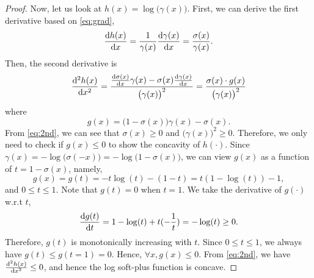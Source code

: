 \documentclass{article}
\begin{document}
\begin{proof}
Now, let us look at $h(x) = \log\big(\gamma(x)\big)$. First, we can derive the first derivative based on \eqref{eq:grad}, 
\[
\frac{{\rm d} h(x)}{{\rm d} x} = \frac{1}{\gamma(x)} \frac{{\rm d} \gamma(x)}{{\rm d} x} = \frac{\sigma(x)}{\gamma(x)}.
\]
Then, the second derivative is 
\begin{align}
\frac{{\rm d}^2 h(x)}{{\rm d} x^2} = \frac{\frac{{\rm d} \sigma(x)}{{\rm d} x}\gamma(x) - \sigma(x)\frac{{\rm d} \gamma(x)}{{\rm d} x}}{\big(\gamma(x)\big)^2} = \frac{\sigma(x)\cdot g(x)}{\big(\gamma(x)\big)^2} \label{eq:2nd}
\end{align}
where 
\[
g(x) = \big(1-\sigma(x)\big)\gamma(x) - \sigma(x).
\]
From \eqref{eq:2nd}, we can see that $\sigma(x) \ge 0$ and $\big(\gamma(x)\big)^2\ge 0$. Therefore, we only need to check if $g(x)\le 0$ to show the concavity of $h(\cdot)$. Since $\gamma(x) = -\log\big(\sigma(-x)\big) = -\log\big(1-\sigma(x)\big)$, we can view $g(x)$ as a function of $t = 1-\sigma(x)$, namely, 
\[
g(x) = g(t) = -t \log(t) - (1 - t) = t(1-\log(t)) - 1, 
\]
and $0 \le t \le 1$. Note that $g(t) = 0$ when $t=1$. We take the derivative of $g(\cdot)$ w.r.t $t$, 
\[
\frac{{\rm d} g(t)}{{\rm d} t} = 1 - \log(t) + t(-\frac{1}{t}) = -\log(t) \ge 0.
\]
Therefore, $g(t)$ is monotonically increasing with $t$. Since $0 \le t \le 1$, we always have $g(t) \le g(t = 1) = 0$. Hence, $\forall x, g(x) \le 0$. From \eqref{eq:2nd}, we have $\frac{{\rm d}^2 h(x)}{{\rm d} x^2} \le 0$, and hence the log soft-plus function is concave. 

\end{proof}


%
%



\end{document}
